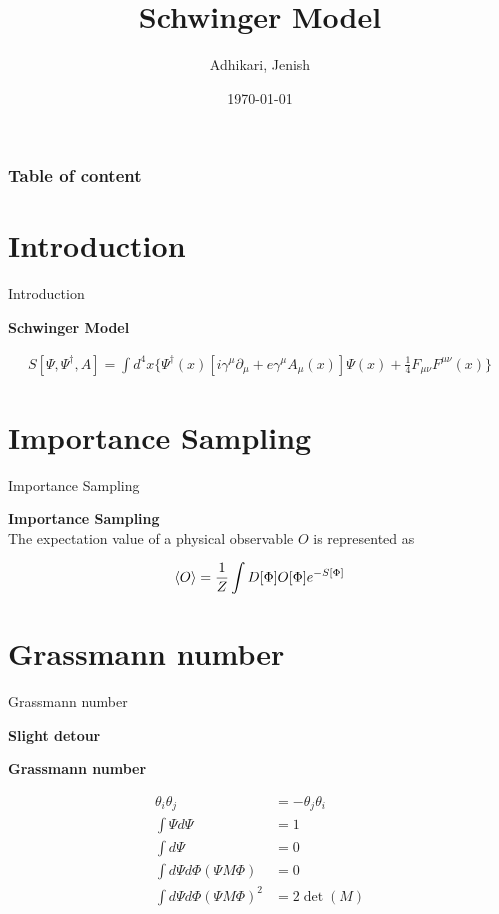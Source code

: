 \documentclass[10pt]{beamer}
\author{Adhikari, Jenish}
\title{Schwinger Model}
\date{\today}
\institute{Universität Bonn}
\begin{document}
  \begin{frame}[plain]
    \titlepage
  \end{frame}
  \begin{frame}
    \frametitle{Table of content}
    \tableofcontents
  \end{frame}
 \section{Introduction}
 \begin{frame}{Introduction}
  \begin{center} \textbf{Schwinger Model}\end{center}
 \begin{align}
     S[\Psi,\Psi^{\dagger},A] = \int{d^4x \{\Psi^\dagger(x)\left[i\gamma^\mu\partial_\mu +e\gamma^\mu A_\mu(x) \right]\Psi(x) +\frac{1}{4} F_{\mu\nu}F^{\mu\nu}(x) \}}
 \end{align}
     
 \end{frame}

 \section{Importance Sampling}
 \begin{frame}{Importance Sampling}
     \begin{center} \textbf{Importance Sampling}\\
        The expectation value of a physical observable $O$ is represented as \end{center}
        \begin{align}
            \braket{O} = \frac{1}{Z}\int D[\Phi]O[\Phi]e^{-S[\Phi]}
        \end{align}

 \end{frame}

 \section{Grassmann number}
 \begin{frame}{Grassmann number}
     \begin{center} \textbf{Slight detour} \end{center}
     \begin{center} \textbf{Grassmann number}\end{center} \begin{align*}
    \theta_i\theta_j &= -\theta_j\theta_i \\
    \int \Psi d\Psi & = 1\\
    \int d\Psi & = 0 \\
    \int d\Psi d\Phi {(\Psi M \Phi)} & = 0\\
    \int d\Psi d\Phi {(\Psi M \Phi)}^2 & = 2 \det(M)
    \end{align*} 
  \end{frame}
\end{document}
